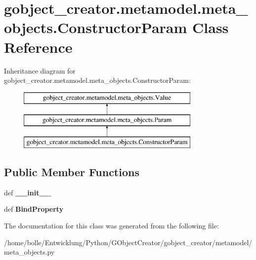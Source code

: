 \hypertarget{classgobject__creator_1_1metamodel_1_1meta__objects_1_1ConstructorParam}{
\section{gobject\_\-creator.metamodel.meta\_\-objects.ConstructorParam Class Reference}
\label{classgobject__creator_1_1metamodel_1_1meta__objects_1_1ConstructorParam}
}
Inheritance diagram for gobject\_\-creator.metamodel.meta\_\-objects.ConstructorParam:\begin{figure}[H]
\begin{center}
\leavevmode
\includegraphics[height=3cm]{classgobject__creator_1_1metamodel_1_1meta__objects_1_1ConstructorParam}
\end{center}
\end{figure}
\subsection*{Public Member Functions}
\begin{DoxyCompactItemize}
\item 
\hypertarget{classgobject__creator_1_1metamodel_1_1meta__objects_1_1ConstructorParam_a4d0e380df38af5891b4f781e31e5a0bd}{
def {\bfseries \_\-\_\-init\_\-\_\-}}
\label{classgobject__creator_1_1metamodel_1_1meta__objects_1_1ConstructorParam_a4d0e380df38af5891b4f781e31e5a0bd}

\item 
\hypertarget{classgobject__creator_1_1metamodel_1_1meta__objects_1_1ConstructorParam_a53815c7ddc7e5d48da5e0ae7c40cabc4}{
def {\bfseries BindProperty}}
\label{classgobject__creator_1_1metamodel_1_1meta__objects_1_1ConstructorParam_a53815c7ddc7e5d48da5e0ae7c40cabc4}

\end{DoxyCompactItemize}


The documentation for this class was generated from the following file:\begin{DoxyCompactItemize}
\item 
/home/bolle/Entwicklung/Python/GObjectCreator/gobject\_\-creator/metamodel/meta\_\-objects.py\end{DoxyCompactItemize}
